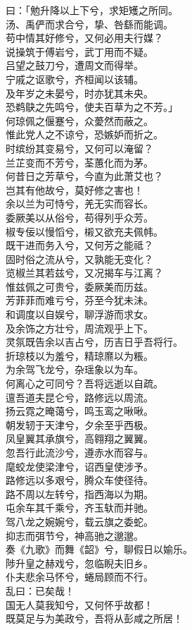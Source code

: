 \documentclass[]{article}
\begin{document}
曰：「勉升降以上下兮，求矩矱之所同。\\
汤、禹俨而求合兮，挚、咎繇而能调。\\
苟中情其好修兮，又何必用夫行媒？\\
说操筑于傅岩兮，武丁用而不疑。\\
吕望之鼓刀兮，遭周文而得举。\\
宁戚之讴歌兮，齐桓闻以该辅。\\
及年岁之未晏兮，时亦犹其未央。\\
恐鹈鴃之先鸣兮，使夫百草为之不芳。」\\
何琼佩之偃蹇兮，众薆然而蔽之。\\
惟此党人之不谅兮，恐嫉妒而折之。\\
时缤纷其变易兮，又何可以淹留？\\
兰芷变而不芳兮，荃蕙化而为茅。\\
何昔日之芳草兮，今直为此萧艾也？\\
岂其有他故兮，莫好修之害也！\\
余以兰为可恃兮，羌无实而容长。\\
委厥美以从俗兮，苟得列乎众芳。\\
椒专佞以慢慆兮，樧又欲充夫佩帏。\\
既干进而务入兮，又何芳之能祗？\\
固时俗之流从兮，又孰能无变化？\\
览椒兰其若兹兮，又况揭车与江离？\\
惟兹佩之可贵兮，委厥美而历兹。\\
芳菲菲而难亏兮，芬至今犹未沬。\\
和调度以自娱兮，聊浮游而求女。\\
及余饰之方壮兮，周流观乎上下。\\
灵氛既告余以吉占兮，历吉日乎吾将行。\\
折琼枝以为羞兮，精琼爢以为粻。\\
为余驾飞龙兮，杂瑶象以为车。\\
何离心之可同兮？吾将远逝以自疏。\\
邅吾道夫昆仑兮，路修远以周流。\\
扬云霓之晻蔼兮，鸣玉鸾之啾啾。\\
朝发轫于天津兮，夕余至乎西极。\\
凤皇翼其承旗兮，高翱翔之翼翼。\\
忽吾行此流沙兮，遵赤水而容与。\\
麾蛟龙使梁津兮，诏西皇使涉予。\\
路修远以多艰兮，腾众车使径待。\\
路不周以左转兮，指西海以为期。\\
屯余车其千乘兮，齐玉轪而并驰。\\
驾八龙之婉婉兮，载云旗之委蛇。\\
抑志而弭节兮，神高驰之邈邈。\\
奏《九歌》而舞《韶》兮，聊假日以媮乐。\\
陟升皇之赫戏兮，忽临睨夫旧乡。\\
仆夫悲余马怀兮，蜷局顾而不行。\\
乱曰：已矣哉！\\
国无人莫我知兮，又何怀乎故都！\\
既莫足与为美政兮，吾将从彭咸之所居！
\end{document}

